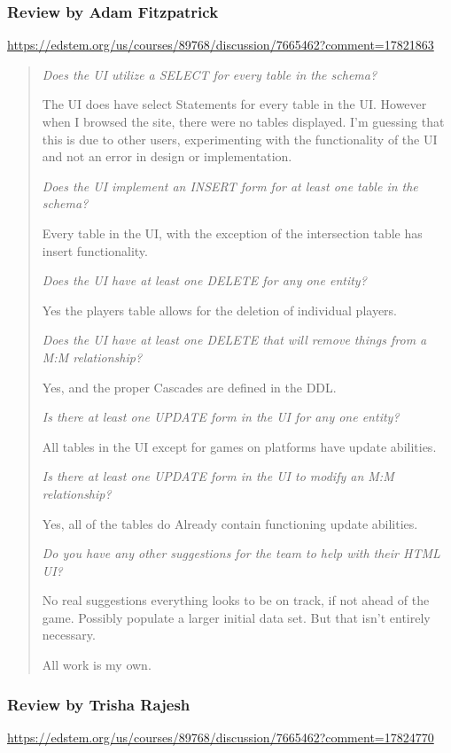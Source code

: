 \documentclass[11pt]{article}
\begin{document}
\subsubsection*{Review by Adam Fitzpatrick}
\url{https://edstem.org/us/courses/89768/discussion/7665462?comment=17821863}

\begin{quote}
\textit{Does the UI utilize a SELECT for every table in the schema?}

The UI does have select Statements for every table in the UI. However when I browsed the site, there were no tables displayed. I'm guessing that this is due to other users, experimenting with the functionality of the UI and not an error in design or implementation.

\textit{Does the UI implement an INSERT form for at least one table in the schema?}

Every table in the UI, with the exception of the intersection table has insert functionality.

\textit{Does the UI have at least one DELETE for any one entity?}

Yes the players table allows for the deletion of individual players.

\textit{Does the UI have at least one DELETE that will remove things from a M:M relationship?}

Yes, and the proper Cascades are defined in the DDL.

\textit{Is there at least one UPDATE form in the UI for any one entity?}

All tables in the UI except for games on platforms have update abilities.

\textit{Is there at least one UPDATE form in the UI to modify an M:M relationship?}

Yes, all of the tables do Already contain functioning update abilities.

\textit{Do you have any other suggestions for the team to help with their HTML UI?}

No real suggestions everything looks to be on track, if not ahead of the game. Possibly populate a larger initial data set. But that isn't entirely necessary.

All work is my own.
\end{quote}

\subsubsection*{Review by Trisha Rajesh}
\url{https://edstem.org/us/courses/89768/discussion/7665462?comment=17824770}
\end{document}
